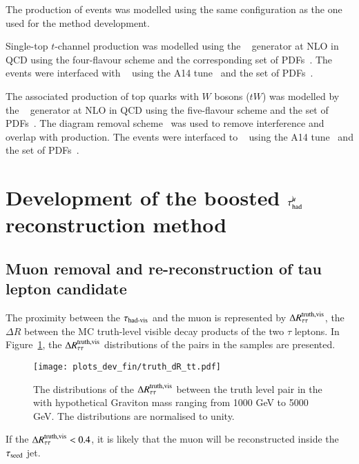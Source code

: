         The production of \ttbar events was modelled using the same configuration as the one used for the method development.

        Single-top \(t\)-channel production was modelled using the
        \POWHEGBOX[v2]~\cite{Frederix:2012dh,Nason:2004rx,Frixione:2007vw,Alioli:2010xd}
        generator at NLO in QCD using the four-flavour scheme and the
        corresponding \NNPDF[3.0nlo] set of PDFs~\cite{Ball:2014uwa}.  The events were
        interfaced with \PYTHIA[8.230]~\cite{Sjostrand:2014zea} using the A14
        tune~\cite{ATL-PHYS-PUB-2014-021} and the \NNPDF[2.3lo] set of
        PDFs~\cite{Ball:2012cx}.

        The associated production of top quarks with \(W\) bosons (\(tW\)) was
        modelled by the
        \POWHEGBOX[v2]~\cite{Re:2010bp,Nason:2004rx,Frixione:2007vw,Alioli:2010xd}
        generator at NLO in QCD using the five-flavour scheme and the
        \NNPDF[3.0nlo] set of PDFs~\cite{Ball:2014uwa}.
        The diagram removal scheme~\cite{Frixione:2008yi} was used to
        remove interference and overlap with \ttbar production.
        The events were interfaced to \PYTHIA[8.230]~\cite{Sjostrand:2014zea} using the A14
        tune~\cite{ATL-PHYS-PUB-2014-021} and the \NNPDF[2.3lo] set of
        PDFs~\cite{Ball:2012cx}.

\section{Development of the boosted $\tau_\mathrm{had}^{\mu\mkern-10mu\backslash}$ reconstruction method} \label{sec:murm}
    \subsection{Muon removal and re-reconstruction of tau lepton candidate} \label{sec:muon_removal}
        The proximity between the $\tau_{\text{had-vis}}$ and the muon 
        is represented by $\Delta R^\mathrm{truth, vis}_\mathrm{\tau\tau}$, the $\Delta R$ between the MC 
        truth-level visible decay products of the two $\tau$ leptons. 
        In Figure~\ref{fig:murm:dr}, the $\Delta R^\mathrm{truth, vis}_\mathrm{\tau\tau}$ distributions of the 
        \tmth pairs in the \GHHFourtau samples are presented.
        \begin{figure}[hbtp]
            \begin{center}
                \texttt{[image: plots\_dev\_fin/truth\_dR\_tt.pdf]}
                \caption{The distributions of the $\Delta R^\mathrm{truth, vis}_\mathrm{\tau\tau}$ between the truth 
                    level \tmth pair in the \GHHFourtau with hypothetical Graviton 
                    mass ranging from 1000 GeV to 5000 GeV. The distributions are normalised to unity.}
                \label{fig:murm:dr}
            \end{center}
        \end{figure}
        If the $\Delta R^\mathrm{truth, vis}_\mathrm{\tau\tau} < 0.4$, it is likely that the muon will 
        be reconstructed inside the $\tau_\mathrm{seed}$ jet. 

